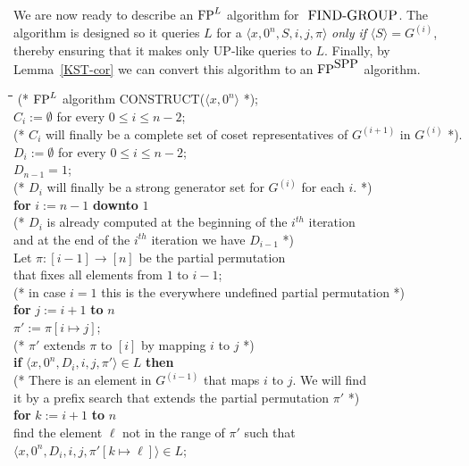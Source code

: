 \documentclass{elsart}
\newcommand{\KW}[1]{{\bf #1}}
\newcommand{\FP}{\mbox{\rm FP}}
\newcommand{\SPP}{\mbox{\rm SPP}}
\newcommand{\FINDGROUP}{\mbox{\small\rm FIND{-}GROUP}}
\renewcommand{\th}[1]{\ensuremath{#1^{th}}}
\renewcommand{\angle}[1]{\langle #1\rangle}
\begin{document}
\begin{pf}
We are now ready to describe an $\FP^L$ algorithm for $\FINDGROUP$.
The algorithm is designed so it queries $L$ for a
$\angle{x,0^n,S,i,j,\pi}$ {\em only if} $\angle{S}=G^{(i)}$, thereby
ensuring that it makes only UP-like queries to $L$. Finally, by
Lemma~\ref{KST-cor} we can convert this algorithm to an $\FP^{\SPP}$
algorithm.
  
\begin{tabbing}
\quad \=\quad \=\quad \=\quad \=\quad       \kill
(* $\FP^L$ algorithm CONSTRUCT($\angle{x,0^n}$  *);\\
$C_i := \emptyset$ for every $0 \leq i \leq n-2$;\\
(* $C_i$ will finally be a complete set of coset representatives of 
         $G^{(i+1)}$ in $G^{(i)}$ *).\\
$D_i := \emptyset$ for every $0 \leq i \leq n-2$;\\
$D_{n-1}=1$;\\
(* $D_i$ will finally be a strong generator set for $G^{(i)}$
        for each $i$. *)\\
\> \KW{for} $i := n - 1$ \KW{downto} $1$\\
\> \>  (* $D_i$ is already computed at the beginning of the $\th{i}$ iteration\\
\> \>  and at the end of the $\th{i}$ iteration we have $D_{i-1}$ *)\\
\> \>   Let $\pi:[i-1] \rightarrow [n]$ be the partial permutation\\ 
\> \>   that fixes all elements from $1$ to $i-1$; \\
\> \>  (* in case $i = 1$ this is the everywhere undefined partial 
permutation *)\\
\> \> \>  \KW{for} $j := i+1$ \KW{to} $n$\\
\> \> \>   $\pi' := \pi[i \mapsto j]$;\\
\> \> \> (* $\pi'$ extends $\pi$ to $[i]$ by mapping $i$ to $j$ *)\\
\> \> \> \KW{if} $\angle{x,0^n,D_i,i,j,\pi'} \in L$ \KW{then}\\
\> \> \> (* There is an element in $G^{(i-1)}$ that maps $i$ to $j$. We will find\\
\> \> \>   it by a prefix search that extends the partial permutation $\pi'$ *)\\
\> \> \>  \KW{for} $k := i+1$ \KW{to} $n$\\
\> \> \> \> find the element $\ell$ not in the range of $\pi'$ such that\\
\> \> \> \> $\angle{x,0^n,D_{i},i,j,\pi'[ k \mapsto \ell]} \in L$;\\

\end{tabbing}
\end{pf}
\end{document}
